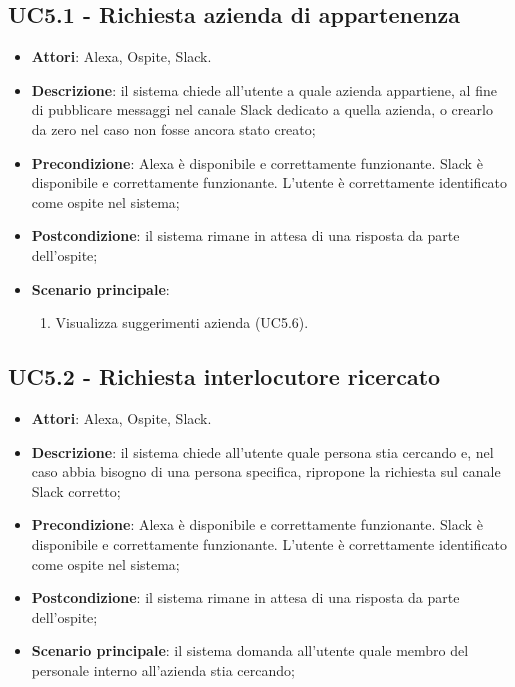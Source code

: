 \documentclass[../AnalisiDeiRequisiti_v3.0.0.tex]{subfiles}
\begin{document}
\subsection{UC5.1 - Richiesta azienda di appartenenza} 
\label{sssec:UC5.1} 
\begin{itemize} 
\item \textbf{Attori}: Alexa, Ospite, Slack.
\item \textbf{Descrizione}: il sistema chiede all'utente a quale azienda appartiene, al fine di pubblicare messaggi nel canale Slack dedicato a quella azienda, o crearlo da zero nel caso non fosse ancora stato creato;
\item \textbf{Precondizione}: Alexa è disponibile e correttamente funzionante. Slack è disponibile e correttamente funzionante. L'utente è correttamente identificato come ospite nel sistema;
\item \textbf{Postcondizione}: il sistema rimane in attesa di una risposta da parte dell'ospite;
\item \textbf{Scenario principale}: \begin{enumerate}\item Visualizza suggerimenti azienda (UC5.6). 
 \end{enumerate}
\end{itemize} 
\subsection{UC5.2 - Richiesta interlocutore ricercato} 
\label{sssec:UC5.2} 
\begin{itemize} 
\item \textbf{Attori}: Alexa, Ospite, Slack.
\item \textbf{Descrizione}: il sistema chiede all'utente quale persona stia cercando e, nel caso abbia bisogno di una persona specifica, ripropone la richiesta sul canale Slack corretto;
\item \textbf{Precondizione}: Alexa è disponibile e correttamente funzionante. Slack è disponibile e correttamente funzionante. L'utente è correttamente identificato come ospite nel sistema;
\item \textbf{Postcondizione}: il sistema rimane in attesa di una risposta da parte dell'ospite;
\item \textbf{Scenario principale}: il sistema domanda all'utente quale membro del personale interno all'azienda stia cercando;
\end{itemize} 
\end{document}
